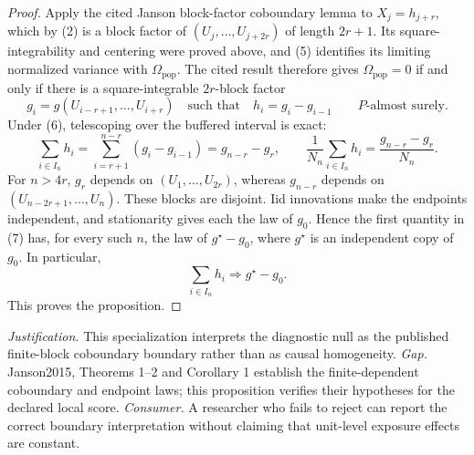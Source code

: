 \documentclass{article}
\begin{document}
\begin{proof}
Apply the cited Janson block-factor coboundary lemma to \(X_j=h_{j+r}\), which by (2) is a block factor of \((U_j,\ldots,U_{j+2r})\) of length \(2r+1\).  Its square-integrability and centering were proved above, and (5) identifies its limiting normalized variance with \(\Omega_{\mathrm{pop}}\).  The cited result therefore gives \(\Omega_{\mathrm{pop}}=0\) if and only if there is a square-integrable \(2r\)-block factor
\[
 g_i=g(U_{i-r+1},\ldots,U_{i+r})
 \quad\text{such that}\quad
 h_i=g_i-g_{i-1}
 \qquad P\text{-almost surely}. \tag{6}
\]
Under (6), telescoping over the buffered interval is exact:
\[
 \sum_{i\in I_n}h_i
 =\sum_{i=r+1}^{n-r}(g_i-g_{i-1})
 =g_{n-r}-g_r,
 \qquad
 \frac1{N_n}\sum_{i\in I_n}h_i
 =\frac{g_{n-r}-g_r}{N_n}. \tag{7}
\]
For \(n>4r\), \(g_r\) depends on \((U_1,\ldots,U_{2r})\), whereas \(g_{n-r}\) depends on \((U_{n-2r+1},\ldots,U_n)\).  These blocks are disjoint.  Iid innovations make the endpoints independent, and stationarity gives each the law of \(g_0\).  Hence the first quantity in (7) has, for every such \(n\), the law of \(g^\star-g_0\), where \(g^\star\) is an independent copy of \(g_0\).  In particular,
\[
 \sum_{i\in I_n}h_i\Rightarrow g^\star-g_0.
\]
This proves the proposition.
\end{proof}
\par\smallskip\noindent \textit{Justification.} This specialization interprets the diagnostic null as the published finite-block coboundary boundary rather than as causal homogeneity. \textit{Gap.} Janson2015, Theorems 1--2 and Corollary 1 establish the finite-dependent coboundary and endpoint laws; this proposition verifies their hypotheses for the declared local score. \textit{Consumer.} A researcher who fails to reject can report the correct boundary interpretation without claiming that unit-level exposure effects are constant.
\end{document}
